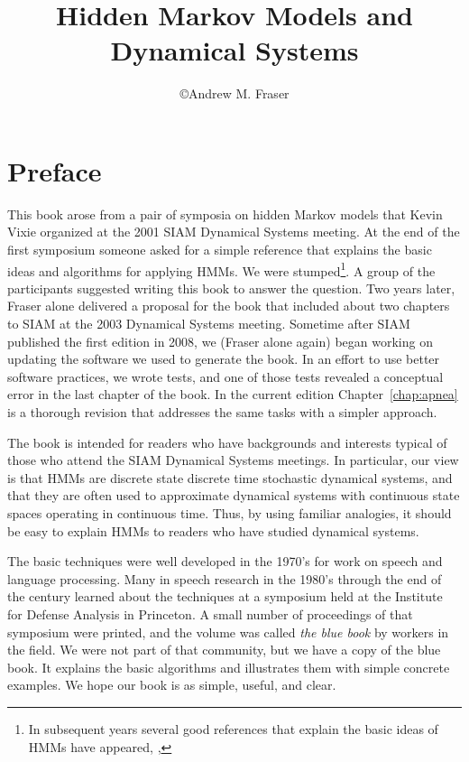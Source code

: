 \documentclass[ltxbook,showlabels, commentsvisible]{hmmdsbook}
\author{\copyright Andrew M. Fraser}
\title{Hidden Markov Models and Dynamical Systems}
\begin{document}
\frontmatter
\maketitle

\chapter*{Preface}
\label{chap:preface}

This book arose from a pair of symposia on hidden Markov models that
Kevin Vixie organized at the 2001 SIAM Dynamical Systems meeting.  At
the end of the first symposium someone asked for a simple reference
that explains the basic ideas and algorithms for applying HMMs.  We
were stumped\footnote{In subsequent years several good references that
  explain the basic ideas of HMMs have appeared, \eg, }.  A group of the participants suggested writing this book
to answer the question.  Two years later, Fraser alone delivered a
proposal for the book that included about two chapters to SIAM at the
2003 Dynamical Systems meeting.  Sometime after SIAM published the
first edition in 2008, we (Fraser alone again) began working on
updating the software we used to generate the book.  In an effort to
use better software practices, we wrote tests, and one of those tests
revealed a conceptual error in the last chapter of the book.  In the
current edition Chapter~\ref{chap:apnea} is a thorough revision that
addresses the same tasks with a simpler approach.

The book is intended for readers who have backgrounds and interests
typical of those who attend the SIAM Dynamical Systems meetings.  In
particular, our view is that HMMs are discrete state discrete time
stochastic dynamical systems, and that they are often used to
approximate dynamical systems with continuous state spaces operating
in continuous time.  Thus, by using familiar analogies, it should be
easy to explain HMMs to readers who have studied dynamical systems.

The basic techniques were well developed in the 1970's for work on
speech and language processing.  Many in speech research in the 1980's
through the end of the century learned about the techniques at a
symposium held at the Institute for Defense Analysis  in Princeton.  A small number of proceedings
of that symposium \cite{ida80} were printed, and the volume was called
\emph{the blue book} by workers in the field.  We were not part of
that community, but we have a copy of the blue book.  It explains the
basic algorithms and illustrates them with simple concrete examples.
We hope our book is as simple, useful, and clear.
\end{document}

